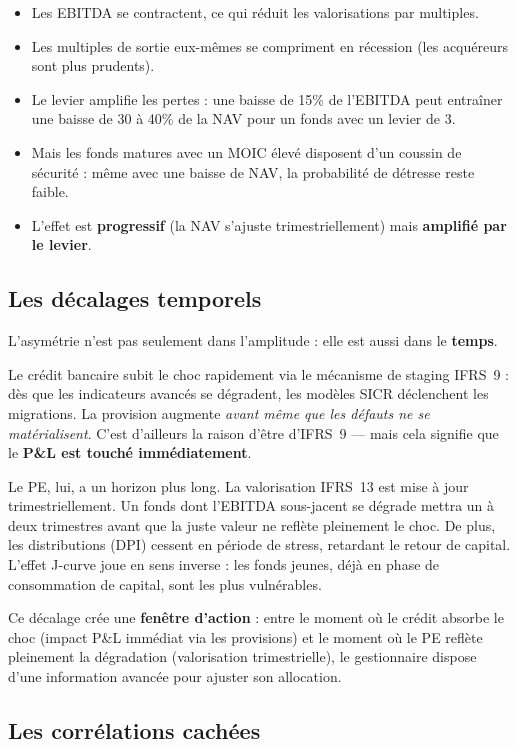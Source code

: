 \documentclass[12pt,a4paper]{article}
\begin{document}
\begin{itemize}
  \item Les EBITDA se contractent, ce qui réduit les valorisations par multiples.
  \item Les multiples de sortie eux-mêmes se compriment en récession (les acquéreurs sont plus prudents).
  \item Le levier amplifie les pertes : une baisse de 15\% de l'EBITDA peut entraîner une baisse de 30 à 40\% de la NAV pour un fonds avec un levier de 3.
  \item Mais les fonds matures avec un MOIC élevé disposent d'un coussin de sécurité : même avec une baisse de NAV, la probabilité de détresse reste faible.
  \item L'effet est \textbf{progressif} (la NAV s'ajuste trimestriellement) mais \textbf{amplifié par le levier}.
\end{itemize}

\subsection{Les décalages temporels}

L'asymétrie n'est pas seulement dans l'amplitude : elle est aussi dans le \textbf{temps}.

Le crédit bancaire subit le choc rapidement via le mécanisme de staging IFRS~9 : dès que les indicateurs avancés se dégradent, les modèles SICR déclenchent les migrations. La provision augmente \textit{avant même que les défauts ne se matérialisent}. C'est d'ailleurs la raison d'être d'IFRS~9 --- mais cela signifie que le \textbf{P\&L est touché immédiatement}.

Le PE, lui, a un horizon plus long. La valorisation IFRS~13 est mise à jour trimestriellement. Un fonds dont l'EBITDA sous-jacent se dégrade mettra un à deux trimestres avant que la juste valeur ne reflète pleinement le choc. De plus, les distributions (DPI) cessent en période de stress, retardant le retour de capital. L'effet J-curve joue en sens inverse : les fonds jeunes, déjà en phase de consommation de capital, sont les plus vulnérables.

Ce décalage crée une \textbf{fenêtre d'action} : entre le moment où le crédit absorbe le choc (impact P\&L immédiat via les provisions) et le moment où le PE reflète pleinement la dégradation (valorisation trimestrielle), le gestionnaire dispose d'une information avancée pour ajuster son allocation.

\subsection{Les corrélations cachées}
\end{document}
